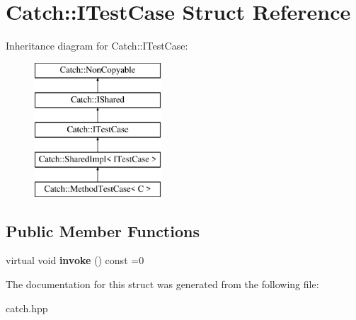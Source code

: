 \hypertarget{structCatch_1_1ITestCase}{}\section{Catch\+:\+:I\+Test\+Case Struct Reference}
\label{structCatch_1_1ITestCase}
Inheritance diagram for Catch\+:\+:I\+Test\+Case\+:\begin{figure}[H]
\begin{center}
\leavevmode
\includegraphics[height=5.000000cm]{structCatch_1_1ITestCase}
\end{center}
\end{figure}
\subsection*{Public Member Functions}
\begin{DoxyCompactItemize}
\item 
virtual void {\bfseries invoke} () const  =0\hypertarget{structCatch_1_1ITestCase_a12b8a2e0140ae975484ec3e96b22b586}{}\label{structCatch_1_1ITestCase_a12b8a2e0140ae975484ec3e96b22b586}

\end{DoxyCompactItemize}


The documentation for this struct was generated from the following file\+:\begin{DoxyCompactItemize}
\item 
catch.\+hpp\end{DoxyCompactItemize}
